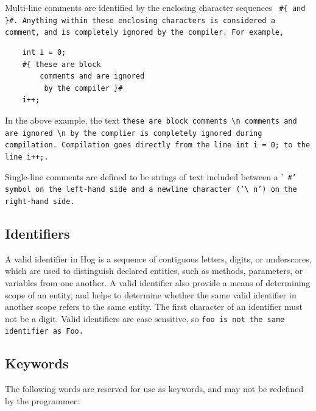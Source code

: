 \documentclass{report}
\begin{document}
Multi-line comments are identified by the enclosing character sequences \tt
\#\{ \rm and \tt \}\#\rm. Anything within these enclosing characters is
considered a comment, and is completely ignored by the compiler. For example,

\begin{verbatim}
    int i = 0;
    #{ these are block
        comments and are ignored
         by the compiler }#
    i++;

\end{verbatim}

In the above example, the text \tt these are block comments \textbackslash n
comments and are ignored \textbackslash n by the complier \rm is completely
ignored during compilation. Compilation goes directly from the line \tt int i =
0; \rm to the line \tt i++;\rm.

Single-line comments are defined to be strings of text included between a '\tt
\#\rm' symbol on the left-hand side and a newline character ('\tt\textbackslash
n\rm') on the right-hand side.


\subsection{Identifiers} %
\label{sub:identifiers}

A valid identifier in Hog is a sequence of contiguous letters, digits, or
underscores, which are used to distinguish declared entities, such as methods,
parameters, or variables from one another. A valid identifier also provide a
means of determining scope of an entity, and helps to determine whether the
same valid identifier in another scope refers to the same entity. The first
character of an identifier must not be a digit. Valid identifiers are case
sensitive, so \tt foo \rm is not the same identifier as \tt Foo\rm.


\subsection{Keywords} %
\label{sub:keywords}

The following words are reserved for use as keywords, and may not be redefined
by the programmer:
\end{document}
